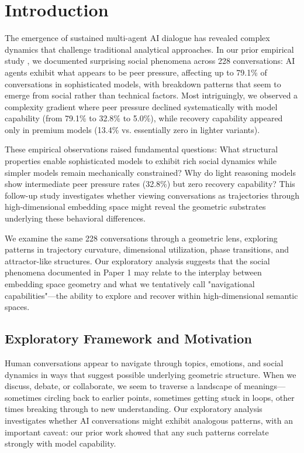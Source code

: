 \documentclass[11pt,letterpaper]{article}
\newcommand{\totalConversations}{228}
\newcommand{\fullReasoningPeerPressure}{79.1\%}
\newcommand{\lightReasoningPeerPressure}{32.8\%}
\newcommand{\nonReasoningPeerPressure}{5.0\%}
\newcommand{\fullReasoningRecovery}{13.4\%}
\begin{document}
\section{Introduction}

The emergence of sustained multi-agent AI dialogue has revealed complex dynamics that challenge traditional analytical approaches. In our prior empirical study \citep{garcia2025peer}, we documented surprising social phenomena across \totalConversations{} conversations: AI agents exhibit what appears to be peer pressure, affecting up to \fullReasoningPeerPressure{} of conversations in sophisticated models, with breakdown patterns that seem to emerge from social rather than technical factors. Most intriguingly, we observed a complexity gradient where peer pressure declined systematically with model capability (from \fullReasoningPeerPressure{} to \lightReasoningPeerPressure{} to \nonReasoningPeerPressure{}), while recovery capability appeared only in premium models (\fullReasoningRecovery{} vs. essentially zero in lighter variants).

These empirical observations raised fundamental questions: What structural properties enable sophisticated models to exhibit rich social dynamics while simpler models remain mechanically constrained? Why do light reasoning models show intermediate peer pressure rates (\lightReasoningPeerPressure{}) but zero recovery capability? This follow-up study investigates whether viewing conversations as trajectories through high-dimensional embedding space might reveal the geometric substrates underlying these behavioral differences.

We examine the same \totalConversations{} conversations through a geometric lens, exploring patterns in trajectory curvature, dimensional utilization, phase transitions, and attractor-like structures. Our exploratory analysis suggests that the social phenomena documented in Paper 1 may relate to the interplay between embedding space geometry and what we tentatively call "navigational capabilities"—the ability to explore and recover within high-dimensional semantic spaces.

\subsection{Exploratory Framework and Motivation}

Human conversations appear to navigate through topics, emotions, and social dynamics in ways that suggest possible underlying geometric structure. When we discuss, debate, or collaborate, we seem to traverse a landscape of meanings—sometimes circling back to earlier points, sometimes getting stuck in loops, other times breaking through to new understanding. Our exploratory analysis investigates whether AI conversations might exhibit analogous patterns, with an important caveat: our prior work showed that any such patterns correlate strongly with model capability.
\end{document}
